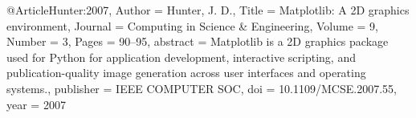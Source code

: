@Article{Hunter:2007,
  Author    = {Hunter, J. D.},
  Title     = {Matplotlib: A 2D graphics environment},
  Journal   = {Computing in Science \& Engineering},
  Volume    = {9},
  Number    = {3},
  Pages     = {90--95},
  abstract  = {Matplotlib is a 2D graphics package used for Python for
  application development, interactive scripting, and publication-quality
  image generation across user interfaces and operating systems.},
  publisher = {IEEE COMPUTER SOC},
  doi       = {10.1109/MCSE.2007.55},
  year      = 2007
}    